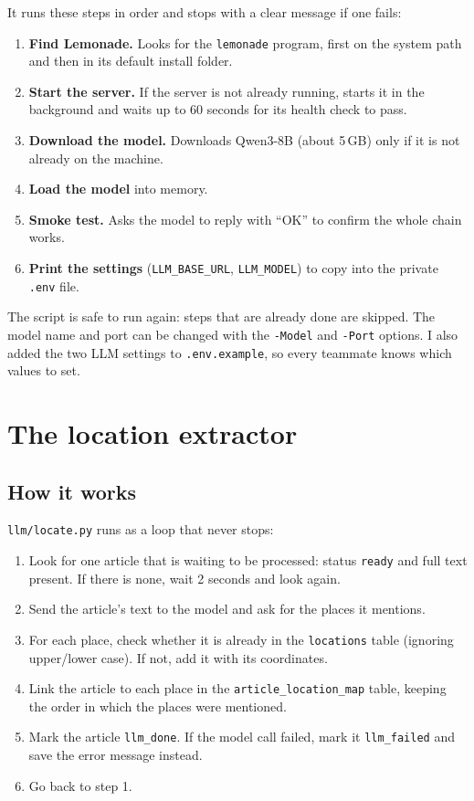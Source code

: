 \documentclass[11pt,a4paper]{article}
\begin{document}
It runs these steps in order and stops with a clear message if one fails:

\begin{enumerate}
  \item \textbf{Find Lemonade.} Looks for the \texttt{lemonade} program, first on the system path and then in its default install folder.
  \item \textbf{Start the server.} If the server is not already running, starts it in the background and waits up to 60 seconds for its health check to pass.
  \item \textbf{Download the model.} Downloads Qwen3-8B (about 5\,GB) only if it is not already on the machine.
  \item \textbf{Load the model} into memory.
  \item \textbf{Smoke test.} Asks the model to reply with ``OK'' to confirm the whole chain works.
  \item \textbf{Print the settings} (\texttt{LLM\_BASE\_URL}, \texttt{LLM\_MODEL}) to copy into the private \texttt{.env} file.
\end{enumerate}

The script is safe to run again: steps that are already done are skipped. The
model name and port can be changed with the \texttt{-Model} and \texttt{-Port}
options. I also added the two LLM settings to \texttt{.env.example}, so every
teammate knows which values to set.

\section{The location extractor}\label{sec:locate}

\subsection{How it works}

\texttt{llm/locate.py} runs as a loop that never stops:

\begin{enumerate}
  \item Look for one article that is waiting to be processed: status \texttt{ready} and full text present. If there is none, wait 2 seconds and look again.
  \item Send the article's text to the model and ask for the places it mentions.
  \item For each place, check whether it is already in the \texttt{locations} table (ignoring upper/lower case). If not, add it with its coordinates.
  \item Link the article to each place in the \texttt{article\_location\_map} table, keeping the order in which the places were mentioned.
  \item Mark the article \texttt{llm\_done}. If the model call failed, mark it \texttt{llm\_failed} and save the error message instead.
  \item Go back to step 1.
\end{enumerate}
\end{document}
